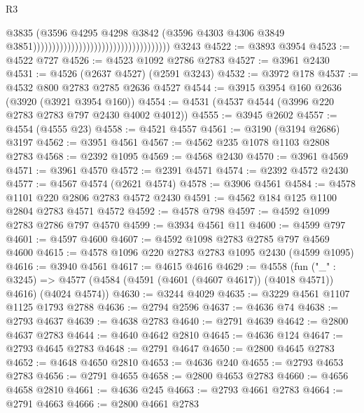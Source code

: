 \begin{lexlean}{R3}
\begin{coremodule}
                                                                        @3835
                                                                        (@3596
                                                                          @4295
                                                                          @4298
                                                                          @3842
                                                                          (@3596
                                                                            @4303
                                                                            @4306
                                                                            @3849
                                                                            @3851))))))))))))))))))))))))))))))))))))
    @3243
@4522 := @3893 @3954
@4523 := @4522 @727
@4526 := @4523 @1092 @2786 @2783
@4527 := @3961 @2430
@4531 := @4526 (@2637 @4527) (@2591 @3243)
@4532 := @3972 @178
@4537 := @4532 @800 @2783 @2785 @2636 @4527
@4544 := @3915 @3954 @160 @2636 (@3920 (@3921 @3954 @160))
@4554 := @4531 (@4537 @4544 (@3996 @220 @2783 @2783 @797 @2430 @4002 @4012))
@4555 := @3945 @2602
@4557 := @4554 (@4555 @23)
@4558 := @4521 @4557
@4561 := @3190 (@3194 @2686) @3197
@4562 := @3951 @4561
@4567 := @4562 @235 @1078 @1103 @2808 @2783
@4568 := @2392 @1095
@4569 := @4568 @2430
@4570 := @3961 @4569
@4571 := @3961 @4570
@4572 := @2391 @4571
@4574 := @2392 @4572 @2430
@4577 := @4567 @4574 (@2621 @4574)
@4578 := @3906 @4561
@4584 := @4578 @1101 @220 @2806 @2783 @4572 @2430
@4591 := @4562 @184 @125 @1100 @2804 @2783 @4571 @4572
@4592 := @4578 @798
@4597 := @4592 @1099 @2783 @2786 @797 @4570
@4599 := @3934 @4561 @11
@4600 := @4599 @797
@4601 := @4597 @4600
@4607 := @4592 @1098 @2783 @2785 @797 @4569 @4600
@4615 := @4578 @1096 @220 @2783 @2783 @1095 @2430 (@4599 @1095)
@4616 := @3940 @4561
@4617 := @4615 @4616
@4629 := @4558
    (fun ("_" : @3245) =>
    @4577 (@4584 (@4591 (@4601 (@4607 @4617)) (@4018 @4571)) @4616) (@4024 @4574))
@4630 := @3244 @4029
@4635 := @3229 @4561 @1107 @1125 @1793 @2788
@4636 := @2794 @2596
@4637 := @4636 @74
@4638 := @2793 @4637
@4639 := @4638 @2783
@4640 := @2791 @4639
@4642 := @2800 @4637 @2783
@4644 := @4640 @4642 @2810
@4645 := @4636 @124
@4647 := @2793 @4645 @2783
@4648 := @2791 @4647
@4650 := @2800 @4645 @2783
@4652 := @4648 @4650 @2810
@4653 := @4636 @240
@4655 := @2793 @4653 @2783
@4656 := @2791 @4655
@4658 := @2800 @4653 @2783
@4660 := @4656 @4658 @2810
@4661 := @4636 @245
@4663 := @2793 @4661 @2783
@4664 := @2791 @4663
@4666 := @2800 @4661 @2783

\end{coremodule}
\end{lexlean}
